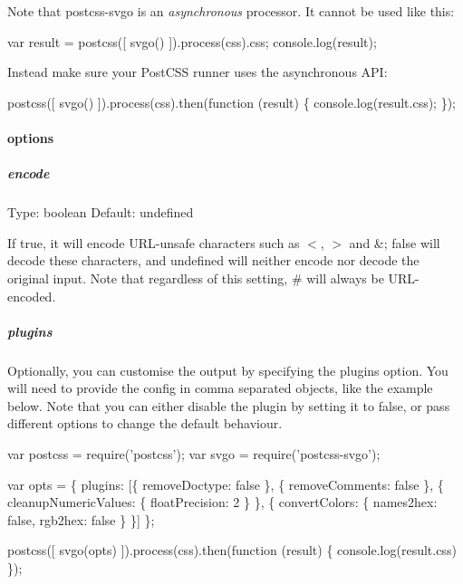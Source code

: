Note that postcss-\/svgo is an {\itshape asynchronous} processor. It cannot be used like this\+:


\begin{DoxyCode}
var result = postcss([ svgo() ]).process(css).css;
console.log(result);
\end{DoxyCode}


Instead make sure your Post\+C\+SS runner uses the asynchronous A\+PI\+:


\begin{DoxyCode}
postcss([ svgo() ]).process(css).then(function (result) \{
    console.log(result.css);
\});
\end{DoxyCode}


\paragraph*{options}

\subparagraph*{encode}

Type\+: {\ttfamily boolean} Default\+: {\ttfamily undefined}

If {\ttfamily true}, it will encode U\+R\+L-\/unsafe characters such as {\ttfamily $<$}, {\ttfamily $>$} and {\ttfamily \&}; {\ttfamily false} will decode these characters, and {\ttfamily undefined} will neither encode nor decode the original input. Note that regardless of this setting, {\ttfamily \#} will always be U\+R\+L-\/encoded.

\subparagraph*{plugins}

Optionally, you can customise the output by specifying the {\ttfamily plugins} option. You will need to provide the config in comma separated objects, like the example below. Note that you can either disable the plugin by setting it to {\ttfamily false}, or pass different options to change the default behaviour.


\begin{DoxyCode}
var postcss = require('postcss');
var svgo = require('postcss-svgo');

var opts = \{
    plugins: [\{
        removeDoctype: false
    \}, \{
        removeComments: false
    \}, \{
        cleanupNumericValues: \{
            floatPrecision: 2
        \}
    \}, \{
        convertColors: \{
            names2hex: false,
            rgb2hex: false
        \}
    \}]
\};

postcss([ svgo(opts) ]).process(css).then(function (result) \{
    console.log(result.css)
\});
\end{DoxyCode}


